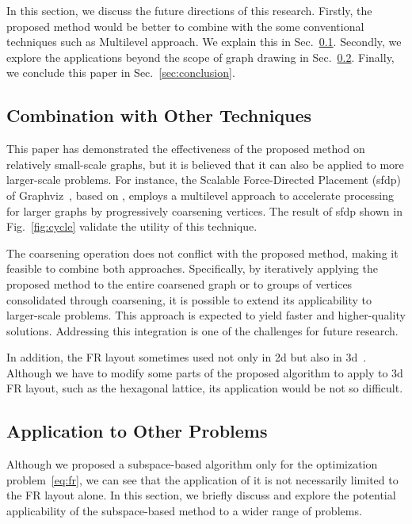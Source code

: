 \documentclass[dvipdfmx,journal]{IEEEtran}
\begin{document}
In this section, we discuss the future directions of this research.
Firstly, the proposed method would be better to combine with the some conventional techniques such as Multilevel approach. We explain this in Sec.~\ref{sec:combination}.
Secondly, we explore the applications beyond the scope of graph drawing in Sec.~\ref{ssec:application}.
Finally, we conclude this paper in Sec.~\ref{sec:conclusion}.

\subsection{Combination with Other Techniques}\label{sec:combination}

This paper has demonstrated the effectiveness of the proposed method on relatively small-scale graphs, but it is believed that it can also be applied to more larger-scale problems.
For instance, the Scalable Force-Directed Placement (sfdp) of Graphviz~\cite{ellsonGraphvizOpenSource2002}, based on \cite{Hu2006EfficientHF}, employs a multilevel approach to accelerate processing for larger graphs by progressively coarsening vertices.
The result of sfdp shown in Fig.~\ref{fig:cycle} validate the utility of this technique.

The coarsening operation does not conflict with the proposed method, making it feasible to combine both approaches.
Specifically, by iteratively applying the proposed method to the entire coarsened graph or to groups of vertices consolidated through coarsening, it is possible to extend its applicability to larger-scale problems.
This approach is expected to yield faster and higher-quality solutions.
Addressing this integration is one of the challenges for future research.

In addition, the FR layout sometimes used not only in 2d but also in 3d~\cite{14738716211060306}. Although we have to modify some parts of the proposed algorithm to apply to 3d FR layout, such as the hexagonal lattice, its application would be not so difficult.

\subsection{Application to Other Problems}\label{ssec:application}

Although we proposed a subspace-based algorithm only for the optimization problem~\eqref{eq:fr}, we can see that the application of it is not necessarily limited to the FR layout alone.
In this section, we briefly discuss and explore the potential applicability of the subspace-based method to a wider range of problems.
\end{document}
